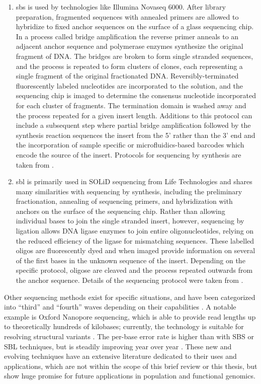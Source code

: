 \begin{enumerate}
    \item \Gls{sbs} is used by technologies like Illumina Novaseq 6000. After library preparation, fragmented sequences with annealed primers are allowed to hybridize to fixed anchor sequences on the surface of a glass sequencing chip. In a process called bridge amplification the reverse primer anneals to an adjacent anchor sequence and polymerase enzymes synthesize the original fragment of DNA. The bridges are broken to form single stranded sequences, and the process is repeated to form clusters of clones, each representing a single fragment of the original fractionated DNA. Reversibly-terminated fluorescently labeled nucleotides are incorporated to the solution, and the sequencing chip is imaged to determine the consensus nucleotide incorporated for each cluster of fragments. The termination domain is washed away and the process repeated for a given insert length. Additions to this protocol can include a subsequent step where partial bridge amplification followed by the synthesis reaction sequences the insert from the 5' rather than the 3' end and the incorporation of sample specific or microfluidics-based barcodes which encode the source of the insert. Protocols for sequencing by synthesis are taken from \textcite{Illumina}.
    \item \Gls{sbl} is primarily used in SOLiD sequencing from Life Technologies and shares many similarities with sequencing by synthesis, including the preliminary fractionation, annealing of sequencing primers, and hybridization with anchors on the surface of the sequencing chip. Rather than allowing individual bases to join the single stranded insert, however, sequencing by ligation allows DNA ligase enzymes to join entire oligonucleotides, relying on the reduced efficiency of the ligase for mismatching sequences. These labelled oligos are fluorescently dyed and when imaged provide information on several of the first bases in the unknown sequence of the insert. Depending on the specific protocol, oligose are cleaved and the process repeated outwards from the anchor sequence. Details of the sequencing protocol were taken from \textcite{Slatko2018}.
\end{enumerate}

Other sequencing methods exist for specific situations, and have been categorized into ``third'' and ``fourth'' waves depending on their capabilities \cite{Slatko2018}. A notable example is Oxford Nanopore sequencing, which is able to provide read lengths up to theoretically hundreds of kilobases; currently, the technology is suitable for resolving structural variants \cite{AByrne2019,Bayega2018}. The per-base error rate is higher than with SBS or SBL techniques, but is steadily improving year over year \cite{Sahlin2021}. These new and evolving techniques have an extensive literature dedicated to their uses and applications, which are not within the scope of this brief review or this thesis, but show huge promise for future applications in population and functional genomics. 

